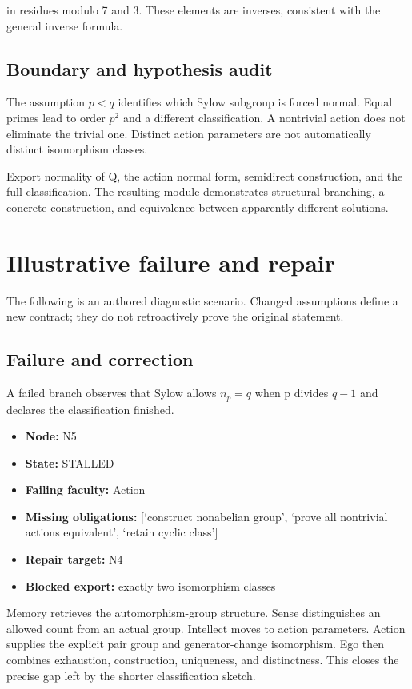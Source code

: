 \documentclass[preprint,12pt,aps,pra,showkeys,amsmath,amssymb,superscriptaddress,floatfix]{revtex4-2}
\theoremstyle{definition}
\theoremstyle{remark}
\begin{document}
in residues modulo 7 and 3. These elements are inverses, consistent with
the general inverse formula.

\subsection{Boundary and hypothesis audit}

The assumption \(p<q\) identifies which Sylow subgroup is forced normal.
Equal primes lead to order \(p^{2}\) and a different classification. A
nontrivial action does not eliminate the trivial one. Distinct action
parameters are not automatically distinct isomorphism classes.

Export normality of Q, the action normal form, semidirect construction,
and the full classification. The resulting module demonstrates
structural branching, a concrete construction, and equivalence between
apparently different solutions.

\section{Illustrative failure and repair}

The following is an authored diagnostic scenario. Changed assumptions
define a new contract; they do not retroactively prove the original
statement.

\subsection{Failure and correction}
A failed branch observes that Sylow allows \(n_p=q\) when p divides
\(q-1\) and declares the classification finished.

\begin{itemize}
\item
  \textbf{Node:} N5
\item
  \textbf{State:} STALLED
\item
  \textbf{Failing faculty:} Action
\item
  \textbf{Missing obligations:} {[}`construct nonabelian group', `prove
  all nontrivial actions equivalent', `retain cyclic class'{]}
\item
  \textbf{Repair target:} N4
\item
  \textbf{Blocked export:} exactly two isomorphism classes
\end{itemize}

Memory retrieves the automorphism-group structure. Sense distinguishes
an allowed count from an actual group. Intellect moves to action
parameters. Action supplies the explicit pair group and generator-change
isomorphism. Ego then combines exhaustion, construction, uniqueness, and
distinctness. This closes the precise gap left by the shorter
classification sketch.
\end{document}
